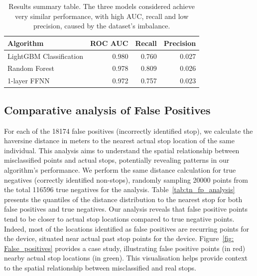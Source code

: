 \documentclass{article}
\begin{document}
\begin{table}[H]
	\centering
	\begin{tabular}{l|rrr}
		\toprule
		\textbf{Algorithm}  & \textbf{ROC AUC} & \textbf{Recall} & \textbf{Precision}\\
		\midrule
		LightGBM Classification & 0.980 & 0.760 & 0.027\\
 		Random Forest  & 0.978 & 0.809 & 0.026\\
		1-layer FFNN & 0.972 &  0.757 & 0.023\\
  
		\bottomrule
	\end{tabular}
	
 \vspace{3.5mm}
 \caption{Results summary table. The three models considered achieve very similar performance, with high AUC, recall and low precision, caused by the dataset's imbalance.}
 \label{tab:results}
\vspace{-3.5mm}
\end{table}


\subsection{Comparative analysis of False Positives}\label{par:false_pos}
For each of the 18174 false positives (incorrectly identified stop), we calculate the haversine distance in meters to the nearest actual stop location of the same individual.
This analysis aims to understand the spatial relationship between misclassified points and actual stops, potentially revealing patterns in our algorithm's performance.
We perform the same distance calculation for true negatives (correctly identified non-stops), randomly sampling 20000 points from the total 116596 true negatives for the analysis.
Table~\ref{tab:tn_fp_analysis} presents the quantiles of the distance distribution to the nearest stop for both false positives and true negatives. Our analysis reveals that false positive points tend to be closer to actual stop locations compared to true negative points.
Indeed, most of the locations identified as false positives are recurring points for the device, situated near actual past stop points for the device.
Figure~\ref{fig: False_positives} provides a case study, illustrating false positive points (in red) nearby actual stop locations (in green). This visualisation helps provide context to the spatial relationship between misclassified and real stops.
\end{document}
